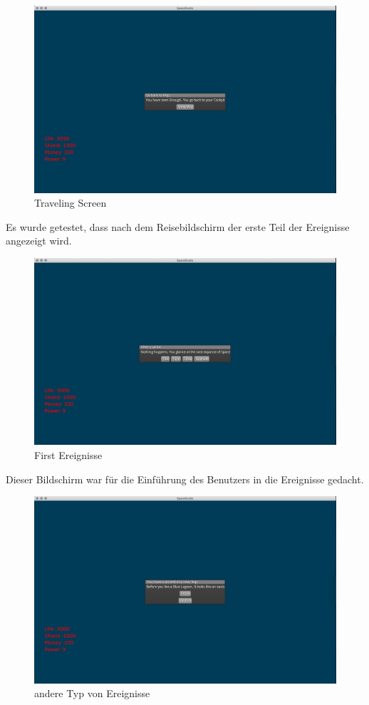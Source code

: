 \documentclass[11pt]{article}
\begin{document}
\begin{figure}[htp]
\centering
\includegraphics[scale=0.3]{TestProtocolBilder/flee.png}
\caption{Traveling Screen}
\end{figure}
\newpage
Es wurde getestet, dass nach dem Reisebildschirm der erste Teil der Ereignisse angezeigt wird.\\
\begin{figure}[htp]
\centering
\includegraphics[scale=0.3]{TestProtocolBilder/InitialGeeinisse.png}
\caption{First Ereignisse}
\end{figure}
Dieser Bildschirm war für die Einführung des Benutzers in die Ereignisse gedacht.
\newpage


\begin{figure}[htp]
\centering
\includegraphics[scale=0.3]{TestProtocolBilder/otherEreignisse.png}
\caption{andere Typ von Ereignisse}
\end{figure}
\end{document}
